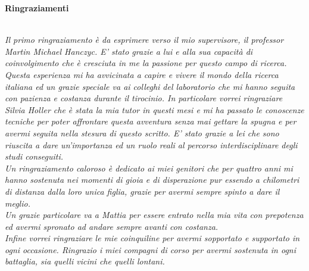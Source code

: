 \thispagestyle{empty}

\begin{center}
  {\bf \Huge Ringraziamenti}
\end{center}

\vspace{4cm}


\emph{
\\Il primo ringraziamento è da esprimere verso il mio supervisore, il professor Martin Michael Hanczyc. E' stato grazie a lui e alla sua capacità di coinvolgimento che è cresciuta in me la passione per questo campo di ricerca. 
\\Questa esperienza mi ha avvicinata a capire e vivere il mondo della ricerca italiana ed un grazie speciale va ai colleghi del laboratorio che mi hanno seguita con pazienza e costanza durante il tirocinio. In particolare vorrei ringraziare Silvia Holler che è stata la mia tutor in questi mesi e mi ha passato le conoscenze tecniche per poter affrontare questa avventura senza mai gettare la spugna e per avermi seguita nella stesura di questo scritto. E' stato grazie a lei che sono riuscita a dare un'importanza ed un ruolo reali al percorso interdisciplinare degli studi conseguiti.
\\Un ringraziamento caloroso è dedicato ai miei genitori che per quattro anni mi hanno sostenuta nei momenti di gioia e di disperazione pur essendo a chilometri di distanza dalla loro unica figlia, grazie per avermi sempre spinto a dare il meglio.
\\Un grazie particolare va a Mattia per essere entrato nella mia vita con prepotenza ed avermi spronato ad andare sempre avanti con costanza.
\\Infine vorrei ringraziare le mie coinquiline per avermi sopportato e supportato in ogni occasione. Ringrazio i miei compagni di corso per avermi sostenuta in ogni battaglia, sia quelli vicini che quelli lontani.       
}
